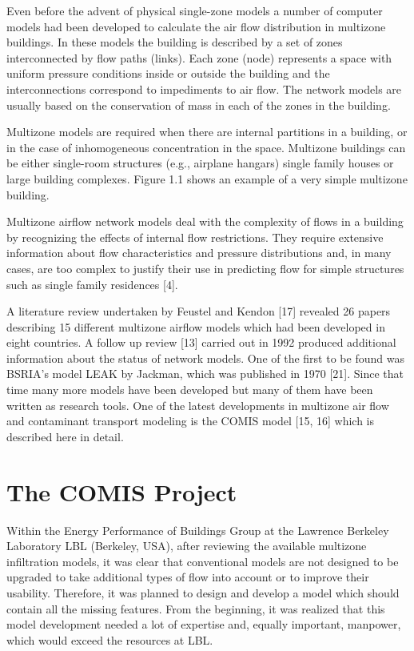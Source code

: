 \documentclass[10pt]{book}
\begin{document}
Even before the advent of physical single-zone models a number of computer models had been developed to calculate the air flow distribution in multizone buildings. In these models the building is described by a set of zones interconnected by flow paths (links). Each zone (node) represents a space with uniform pressure conditions inside or outside the building and the interconnections correspond to impediments to air flow. The network models are usually based on the conservation of mass in each of the zones in the building.

Multizone models are required when there are internal partitions in a building, or in the case of inhomogeneous concentration in the space. Multizone buildings can be either single-room structures (e.g., airplane hangars) single family houses or large building complexes. Figure 1.1 shows an example of a very simple multizone building.

Multizone airflow network models deal with the complexity of flows in a building by recognizing the effects of internal flow restrictions. They require extensive information about flow characteristics and pressure distributions and, in many cases, are too complex to justify their use in predicting flow for simple structures such as single family residences [4].

A literature review undertaken by Feustel and Kendon [17] revealed 26 papers describing 15 different multizone airflow models which had been developed in eight countries. A follow up review [13] carried out in 1992 produced additional information about the status of network models. One of the first to be found was BSRIA's model LEAK by Jackman, which was published in 1970 [21]. Since that time many more models have been developed but many of them have been written as research tools. One of the latest developments in multizone air flow and contaminant transport modeling is the COMIS model [15, 16] which is described here in detail.

\section{The COMIS Project}

Within the Energy Performance of Buildings Group at the Lawrence Berkeley Laboratory LBL (Berkeley, USA), after reviewing the available multizone infiltration models, it was clear that conventional models are not designed to be upgraded to take additional types of flow into account or to improve their usability. Therefore, it was planned to design and develop a model which should contain all the missing features. From the beginning, it was realized that this model development needed a lot of expertise and, equally important, manpower, which would exceed the resources at LBL. 
\end{document}
